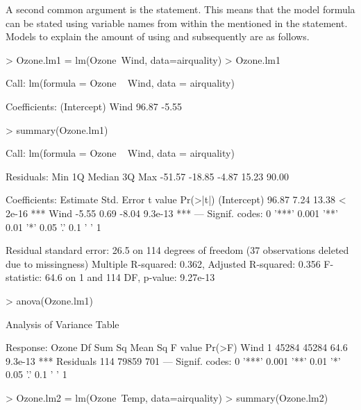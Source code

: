 A second common argument is the  statement. This means that the model formula can be stated using variable names from within the  mentioned in the  statement. Models to explain the amount of  using  and subsequently  are as follows.
\begin{Schunk}
\begin{Sinput}
> Ozone.lm1 = lm(Ozone~Wind, data=airquality)
> Ozone.lm1
\end{Sinput}
\begin{Soutput}

Call:
lm(formula = Ozone ~ Wind, data = airquality)

Coefficients:
(Intercept)         Wind  
      96.87        -5.55  
\end{Soutput}
\begin{Sinput}
> summary(Ozone.lm1)
\end{Sinput}
\begin{Soutput}

Call:
lm(formula = Ozone ~ Wind, data = airquality)

Residuals:
   Min     1Q Median     3Q    Max 
-51.57 -18.85  -4.87  15.23  90.00 

Coefficients:
            Estimate Std. Error t value Pr(>|t|)    
(Intercept)    96.87       7.24   13.38  < 2e-16 ***
Wind           -5.55       0.69   -8.04  9.3e-13 ***
---
Signif. codes:  
0 '***' 0.001 '**' 0.01 '*' 0.05 '.' 0.1 ' ' 1

Residual standard error: 26.5 on 114 degrees of freedom
  (37 observations deleted due to missingness)
Multiple R-squared:  0.362,	Adjusted R-squared:  0.356 
F-statistic: 64.6 on 1 and 114 DF,  p-value: 9.27e-13
\end{Soutput}
\begin{Sinput}
> anova(Ozone.lm1)
\end{Sinput}
\begin{Soutput}
Analysis of Variance Table

Response: Ozone
           Df Sum Sq Mean Sq F value  Pr(>F)    
Wind        1  45284   45284    64.6 9.3e-13 ***
Residuals 114  79859     701                    
---
Signif. codes:  
0 '***' 0.001 '**' 0.01 '*' 0.05 '.' 0.1 ' ' 1
\end{Soutput}
\begin{Sinput}
> Ozone.lm2 = lm(Ozone~Temp, data=airquality)
> summary(Ozone.lm2)
\end{Sinput}
\begin{Soutput}


\end{Soutput}
\end{Schunk}
